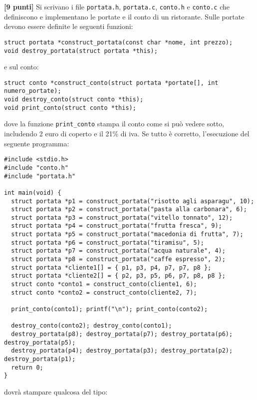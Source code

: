 \documentclass{article}[10pt]
\newcounter{esnu}
\newenvironment{esercizio}{\medskip \noindent {\bf Esercizio\addtocounter{esnu}{1} \arabic{esnu}}}{}
\begin{document}
\begin{esercizio}
\textbf{[9 punti]}
%
Si scrivano i file \texttt{portata.h}, \texttt{portata.c}, \texttt{conto.h} e \texttt{conto.c} che
definiscono e implementano le portate e il conto di un ristorante. Sulle portate devono essere definite
le seguenti funzioni:

{\small
\begin{verbatim}
struct portata *construct_portata(const char *nome, int prezzo);
void destroy_portata(struct portata *this);
\end{verbatim}
}

\noindent
e sul conto:

{\small
\begin{verbatim}
struct conto *construct_conto(struct portata *portate[], int numero_portate);
void destroy_conto(struct conto *this);
void print_conto(struct conto *this);
\end{verbatim}
}

\noindent
dove la funzione \texttt{print\_conto} stampa il conto come si pu\`o vedere sotto, includendo
2 euro di coperto e il 21\% di iva.
Se tutto \`e corretto, l'esecuzione del seguente programma:

{\small
\begin{verbatim}
#include <stdio.h>
#include "conto.h"
#include "portata.h"

int main(void) {
  struct portata *p1 = construct_portata("risotto agli asparagu", 10);
  struct portata *p2 = construct_portata("pasta alla carbonara", 6);
  struct portata *p3 = construct_portata("vitello tonnato", 12);
  struct portata *p4 = construct_portata("frutta fresca", 9);
  struct portata *p5 = construct_portata("macedonia di frutta", 7);
  struct portata *p6 = construct_portata("tiramisu", 5);
  struct portata *p7 = construct_portata("acqua naturale", 4);
  struct portata *p8 = construct_portata("caffe espresso", 2);
  struct portata *cliente1[] = { p1, p3, p4, p7, p7, p8 };
  struct portata *cliente2[] = { p2, p3, p5, p6, p7, p8, p8 };
  struct conto *conto1 = construct_conto(cliente1, 6);
  struct conto *conto2 = construct_conto(cliente2, 7);

  print_conto(conto1); printf("\n"); print_conto(conto2);

  destroy_conto(conto2); destroy_conto(conto1);
  destroy_portata(p8); destroy_portata(p7); destroy_portata(p6); destroy_portata(p5);
  destroy_portata(p4); destroy_portata(p3); destroy_portata(p2); destroy_portata(p1);
  return 0;
}
\end{verbatim}}
\noindent
dovr\`a stampare qualcosa del tipo:


\end{esercizio}
\end{document}
